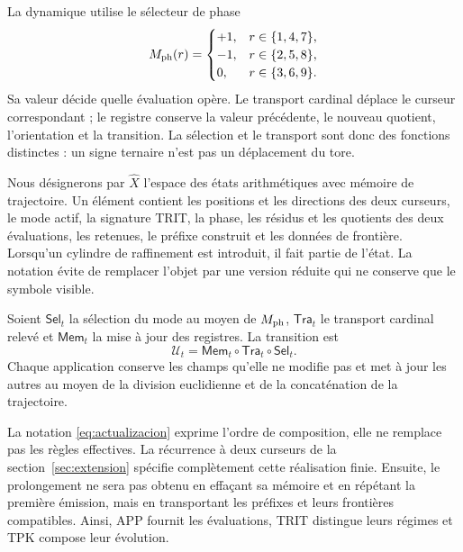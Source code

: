 La dynamique utilise le sélecteur de phase
\[
 M_{\rm ph}(r)=
 \begin{cases}
 +1,&r\in\{1,4,7\},\\
 -1,&r\in\{2,5,8\},\\
 0,&r\in\{3,6,9\}.
 \end{cases}
\]
Sa valeur décide quelle évaluation opère. Le transport cardinal déplace le curseur correspondant ; le registre conserve la valeur précédente, le nouveau quotient, l'orientation et la transition. La sélection et le transport sont donc des fonctions distinctes : un signe ternaire n'est pas un déplacement du tore.

Nous désignerons par \(\widehat X\) l'espace des états arithmétiques avec mémoire de trajectoire. Un élément contient les positions et les directions des deux curseurs, le mode actif, la signature TRIT, la phase, les résidus et les quotients des deux évaluations, les retenues, le préfixe construit et les données de frontière. Lorsqu'un cylindre de raffinement est introduit, il fait partie de l'état. La notation évite de remplacer l'objet par une version réduite qui ne conserve que le symbole visible.

\begin{definition}
Soient \(\mathsf{Sel}_t\) la sélection du mode au moyen de \(M_{\rm ph}\), \(\mathsf{Tra}_t\) le transport cardinal relevé et \(\mathsf{Mem}_t\) la mise à jour des registres. La transition est
\begin{equation}
 \mathcal U_t=\mathsf{Mem}_t\circ\mathsf{Tra}_t\circ\mathsf{Sel}_t.
 \label{eq:actualizacion}
\end{equation}
Chaque application conserve les champs qu'elle ne modifie pas et met à jour les autres au moyen de la division euclidienne et de la concaténation de la trajectoire.
\end{definition}

La notation \eqref{eq:actualizacion} exprime l’ordre de composition, elle ne
remplace pas les règles effectives. La récurrence à deux curseurs de la
section~\ref{sec:extension} spécifie complètement cette réalisation finie.
Ensuite, le prolongement ne sera pas obtenu en effaçant sa mémoire et en répétant la
première émission, mais en transportant les préfixes et leurs frontières compatibles.
Ainsi, APP fournit les évaluations, TRIT distingue leurs régimes
et TPK compose leur évolution.




